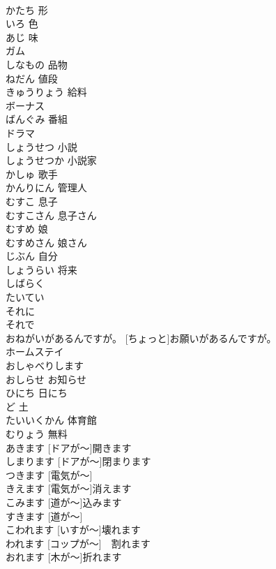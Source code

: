 \documentclass[8pt]{extreport}
\begin{document}
\begin{CJK}{UTF8}{min}
\\	かたち	形	
\\	いろ	色	
\\	あじ	味	
\\	ガム			
\\	しなもの	品物	
\\	ねだん	値段	
\\	きゅうりょう	給料	
\\	ボーナス			
\\	ばんぐみ	番組	
\\	ドラマ			
\\	しょうせつ	小説	
\\	しょうせつか	小説家	
\\	かしゅ	歌手	
\\	かんりにん	管理人	
\\	むすこ	息子	
\\	むすこさん	息子さん	
\\	むすめ	娘	
\\	むすめさん	娘さん	
\\	じぶん	自分	
\\	しょうらい	将来	
\\	しばらく			
\\	たいてい			
\\	それに			
\\	それで			
\\	[ちょっと]おねがいがあるんですが。	[ちょっと]お願いがあるんですが。	
\\	ホームステイ			
\\	おしゃべりします			
\\	おしらせ	お知らせ	
\\	ひにち	日にち	
\\	ど	土	
\\	たいいくかん	体育館	
\\	むりょう	無料	
\\	[ドアが～]あきます	[ドアが～]開きます	
\\	[ドアが～]しまります	[ドアが～]閉まります	
\\	[でんきが～] つきます	[電気が～]	
\\	[でんきが～]きえます	[電気が～]消えます	
\\	[みちが～]こみます	[道が～]込みます	
\\	[みちが～] すきます	[道が～]	
\\	[いすが～]こわれます	[いすが～]壊れます	
\\	[コップが～]われます	[コップが～]　割れます	
\\	[きが～] おれます	[木が～]折れます	

\end{CJK}
\end{document}
